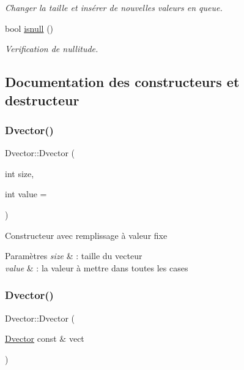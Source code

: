 \begin{DoxyCompactItemize}
\begin{DoxyCompactList}\small\item\em Changer la taille et insérer de nouvelles valeurs en queue. \end{DoxyCompactList}\item 
\mbox{\label{class_dvector_a2300bc9dff4d2bf480a22bf88c37085b}} 
bool \hyperlink{class_dvector_a2300bc9dff4d2bf480a22bf88c37085b}{isnull} ()
\begin{DoxyCompactList}\small\item\em Verification de nullitude. \end{DoxyCompactList}\end{DoxyCompactItemize}


\subsection{Documentation des constructeurs et destructeur}
\mbox{\label{class_dvector_a8a4feb509178ccc26a7d3805548fab17}} 
\subsubsection{\texorpdfstring{Dvector()}{Dvector()}\hspace{0.1cm}{\footnotesize\ttfamily [1/2]}}
{\footnotesize\ttfamily Dvector\+::\+Dvector (\begin{DoxyParamCaption}\item[{int}]{size,  }\item[{int}]{value = {} }\end{DoxyParamCaption})}

Constructeur avec remplissage à valeur fixe 
\begin{DoxyParams}{Paramètres}
{\em size} & \+: taille du vecteur \\
\hline
{\em value} & \+: la valeur à mettre dans toutes les cases \\
\hline
\end{DoxyParams}
\mbox{\label{class_dvector_aa3a4f95e9bfe8139537593f86640d3af}} 
\subsubsection{\texorpdfstring{Dvector()}{Dvector()}\hspace{0.1cm}{\footnotesize\ttfamily [2/2]}}
{\footnotesize\ttfamily Dvector\+::\+Dvector (\begin{DoxyParamCaption}\item[{\hyperlink{class_dvector}{Dvector} const \&}]{vect }\end{DoxyParamCaption})}



